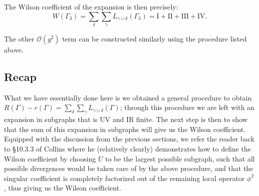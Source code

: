 \documentclass{article}
\begin{document}
The Wilson coefficient of the expansion is then precisely:
\begin{equation}
    W(\Gamma_3) = \sum_\delta \sum_\gamma L_{\gamma \cup \delta} (\Gamma_3) = \text{I} + \text{II} + \text{III} + \text{IV}.
\end{equation}

The other $\mathcal{O}(g^2)$ term can be constructed similarly using the procedure listed above.

\subsection{Recap}
What we have essentially done here is we obtained a general procedure to obtain $R(\Gamma) - r(\Gamma) = \sum_\delta \sum_\gamma L_{\gamma \cup \delta}(\Gamma)$; through this procedure we are left with an expansion in subgraphs that is UV and IR finite. The next step is then to show that the sum of this expansion in subgraphs will give us the Wilson coefficient. Equipped with the discussion from the previous sections, we refer the reader back to \S10.3.3 of Collins where he (relatively clearly) demonstrates how to define the Wilson coefficient by choosing $U$ to be the largest possible subgraph, such that all possible divergences would be taken care of by the above procedure, and that the singular coefficient is completely factorized out of the remaining local operator $\phi^2$, thus giving us the Wilson coefficient. 


\newpage

 

\end{document}

